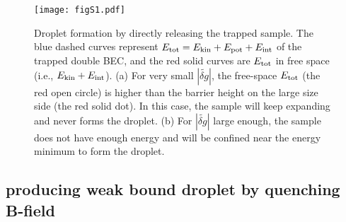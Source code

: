 \begin{figure}[hbt]
\begin{center}
\texttt{[image: figS1.pdf]}
\end{center}
\caption[Droplet formation by directly releasing the trapped sample.]{Droplet formation by directly releasing the trapped sample. The blue dashed curves represent $E_{\rm tot} = E_{\rm kin}+E_{\rm pot}+E_{\rm int}$ of the trapped double BEC, and the red solid curves are $E_{\rm tot}$ in free space (i.e., $E_{\rm kin}+E_{\rm int}$). (a) For very small $|\widetilde{\delta g}|$, the free-space $E_{\rm tot}$ (the red open circle) is higher than the barrier height on the large size side (the red solid dot). In this case, the sample will keep expanding and never forms the droplet. (b) For $|\widetilde{\delta g}|$ large enough, the sample does not have enough energy and will be confined near the energy minimum to form the droplet.}
\label{figS1}
\end{figure}

\subsection{producing weak bound droplet by quenching B-field}

